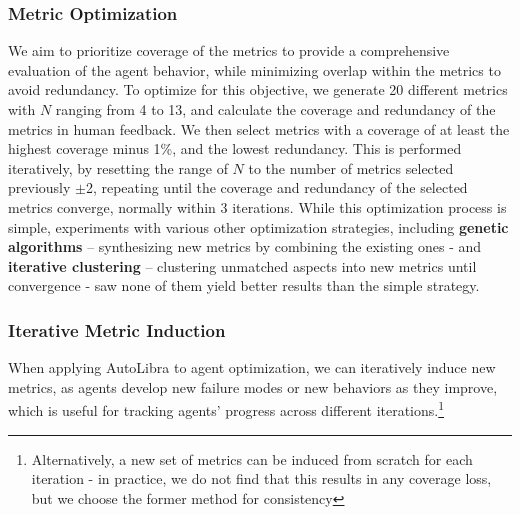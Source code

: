 \subsubsection{Metric Optimization}
\label{sec:metric-optimization}
We aim to prioritize coverage of the metrics to provide a comprehensive evaluation of the agent behavior,
while minimizing overlap within the metrics to avoid redundancy.
To optimize for this objective, we generate 20 different metrics with $N$ ranging from 4 to 13,
and calculate the coverage and redundancy of the metrics in human feedback.
We then select metrics with a coverage of at least the highest coverage minus 1\%,
and the lowest redundancy.
This is performed iteratively, by resetting the range of $N$ to the number of metrics selected
previously $\pm$2, repeating until the coverage and redundancy
of the selected metrics converge, normally within 3 iterations.
While this optimization process is simple, experiments with various other optimization
strategies, including \textbf{genetic algorithms} -- synthesizing new metrics by combining the existing ones -
and \textbf{iterative clustering} -- clustering unmatched aspects into new metrics until convergence - saw none of them
yield better results than the simple strategy.

\subsubsection{Iterative Metric Induction}
\label{sec:iterative-induction}
When applying AutoLibra to agent optimization, we can iteratively induce new metrics, as agents develop new failure modes or new behaviors as they improve, which is useful for tracking agents' progress across different iterations.\footnote{Alternatively, a new set of metrics can be induced from scratch for each iteration -  in practice, we do not find that this results in any coverage loss, but we choose the former method for consistency} 

